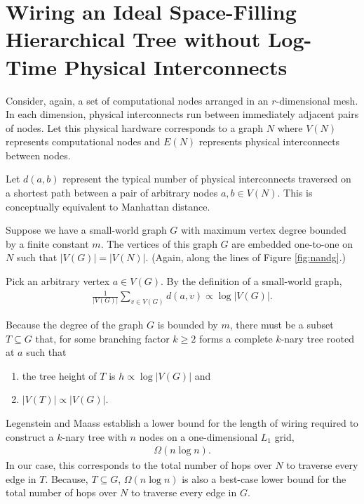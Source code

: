 \section{Wiring an Ideal Space-Filling Hierarchical Tree without Log-Time Physical Interconnects} \label{sec:proof2}

Consider, again, a set of computational nodes arranged in an $r$-dimensional mesh.
In each dimension, physical interconnects run between immediately adjacent pairs of nodes.
Let this physical hardware corresponds to a graph $N$ where $V(N)$ represents computational nodes and $E(N)$ represents physical interconnects between nodes.

Let $d(a,b)$ represent the typical number of physical interconnects traversed on a shortest path between a pair of arbitrary nodes $a, b \in V(N)$.
This is conceptually equivalent to Manhattan distance.

Suppose we have a small-world graph $G$ with maximum vertex degree bounded by a finite constant $m$.
The vertices of this graph $G$ are embedded one-to-one on $N$ such that $|V(G)| = |V(N)|$.
(Again, along the lines of Figure \ref{fig:nandg}.)


Pick an arbitrary vertex $a \in V(G)$.
By the definition of a small-world graph,
\begin{align*}
  \frac{1}{|V(G)|} \sum_{v \in V(G)} d(a, v) \propto \log |V(G)|.
\end{align*}

Because the degree of the graph $G$ is bounded by $m$, there must be a subset $T \subseteq G$ that, for some branching factor $k \geq 2$ forms a complete $k$-nary tree rooted at $a$ such that
\begin{enumerate}
  \item the tree height of $T$ is $h \propto \log |V(G)|$ and
  \item $|V(T)| \propto |V(G)|$.
\end{enumerate}

Legenstein and Maass  establish a lower bound for the length of wiring required to construct a $k$-nary tree with $n$ nodes on a one-dimensional $L_1$ grid,
\begin{align*}
\Omega(n \log n).
\end{align*}
In our case, this corresponds to the total number of hops over $N$ to traverse every edge in $T$.
Because, $T \subseteq G$, $\Omega(n \log n)$ is also a best-case lower bound for the total number of hops over $N$ to traverse every edge in $G$.

